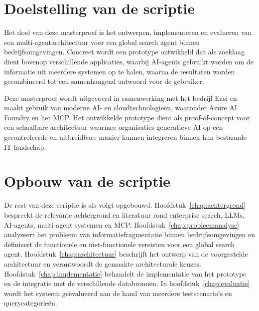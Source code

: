 \section{Doelstelling van de scriptie}
\label{sec:doelstelling}

Het doel van deze masterproef is het ontwerpen, implementeren en evalueren van een multi-agentarchitectuur voor een global search agent binnen bedrijfsomgevingen. Concreet wordt een prototype ontwikkeld dat als zoeklaag dient bovenop verschillende applicaties, waarbij \gls{AI}-agents gebruikt worden om de informatie uit meerdere systemen op te halen, waarna de resultaten worden gecombineerd tot een samenhangend antwoord voor de gebruiker.

Deze masterproef wordt uitgevoerd in samenwerking met het bedrijf Easi en maakt gebruik van moderne \gls{AI}- en cloudtechnologieën, waaronder Azure AI Foundry en het \gls{MCP}. Het ontwikkelde prototype dient als proof-of-concept voor een schaalbare architectuur waarmee organisaties generatieve \gls{AI} op een gecontroleerde en uitbreidbare manier kunnen integreren binnen hun bestaande \gls{IT}-landschap.

\section{Opbouw van de scriptie}
\label{sec:opbouw}

De rest van deze scriptie is als volgt opgebouwd. Hoofdstuk~\ref{chap:achtergrond} bespreekt de relevante achtergrond en literatuur rond enterprise search, \glspl{LLM}, \gls{AI}-agents, multi-agent systemen en \gls{MCP}. Hoofdstuk~\ref{chap:probleemanalyse} analyseert het probleem van informatiefragmentatie binnen bedrijfsomgevingen en definieert de functionele en niet-functionele vereisten voor een global search agent. Hoofdstuk~\ref{chap:architectuur} beschrijft het ontwerp van de voorgestelde architectuur en verantwoordt de gemaakte architecturale keuzes. Hoofdstuk~\ref{chap:implementatie} behandelt de implementatie van het prototype en de integratie met de verschillende databronnen. In hoofdstuk~\ref{chap:evaluatie} wordt het systeem geëvalueerd aan de hand van meerdere testscenario's en querycategorieën.

